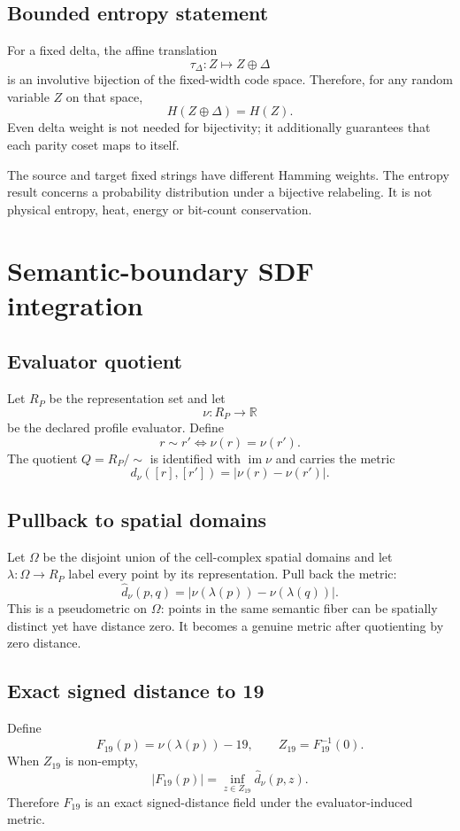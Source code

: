 \documentclass[10pt,a4paper]{article}
\begin{document}
\subsection{Bounded entropy statement}
For a fixed delta, the affine translation
\[
\tau_\Delta:Z\mapsto Z\oplus\Delta
\]
is an involutive bijection of the fixed-width code space. Therefore, for any random variable $Z$ on that space,
\[
H(Z\oplus\Delta)=H(Z).
\]
Even delta weight is not needed for bijectivity; it additionally guarantees that each parity coset maps to itself.

\begin{boundbox}
The source and target fixed strings have different Hamming weights. The entropy result concerns a probability distribution under a bijective relabeling. It is not physical entropy, heat, energy or bit-count conservation.
\end{boundbox}

\section{Semantic-boundary SDF integration}

\subsection{Evaluator quotient}
Let $R_P$ be the representation set and let
\[
\nu:R_P\to\mathbb R
\]
be the declared profile evaluator. Define
\[
r\sim r'\iff\nu(r)=\nu(r').
\]
The quotient $Q=R_P/{\sim}$ is identified with $\operatorname{im}\nu$ and carries the metric
\[
d_\nu([r],[r'])=|\nu(r)-\nu(r')|.
\]

\subsection{Pullback to spatial domains}
Let $\Omega$ be the disjoint union of the cell-complex spatial domains and let $\lambda:\Omega\to R_P$ label every point by its representation. Pull back the metric:
\[
\widehat d_\nu(p,q)=|\nu(\lambda(p))-\nu(\lambda(q))|.
\]
This is a pseudometric on $\Omega$: points in the same semantic fiber can be spatially distinct yet have distance zero. It becomes a genuine metric after quotienting by zero distance.

\subsection{Exact signed distance to 19}
Define
\[
F_{19}(p)=\nu(\lambda(p))-19,
\qquad
Z_{19}=F_{19}^{-1}(0).
\]
When $Z_{19}$ is non-empty,
\[
|F_{19}(p)|=\inf_{z\in Z_{19}}\widehat d_\nu(p,z).
\]
Therefore $F_{19}$ is an exact signed-distance field under the evaluator-induced metric.
\end{document}
